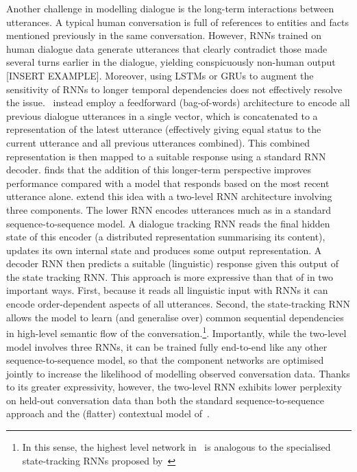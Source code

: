 \documentclass[11pt,letterpaper]{article}
\begin{document}
Another challenge in modelling dialogue is the long-term interactions between utterances. A typical human conversation is full of references to entities and facts mentioned previously in the same conversation. However, RNNs trained on human dialogue data generate utterances that clearly contradict those made several turns earlier in the dialogue, yielding conspicuously non-human output [INSERT EXAMPLE]. Moreover, using LSTMs or GRUs to augment the sensitivity of RNNs to longer temporal dependencies does not effectively resolve the issue.~ instead employ a feedforward (bag-of-words) architecture to encode all previous dialogue utterances in a single vector, which is concatenated to a representation of the latest utterance (effectively giving equal status to the current utterance and all previous utterances combined). This combined representation is then mapped to a suitable response using a standard RNN decoder.  finds that the addition of this longer-term perspective improves performance compared with a model that responds based on the most recent utterance alone.  extend this idea with a two-level RNN architecture involving three components. The lower RNN encodes utterances much as in a standard sequence-to-sequence model. A dialogue tracking RNN reads the final hidden state of this encoder (a distributed representation summarising its content), updates its own internal state and produces some output representation. A decoder RNN then predicts a suitable (linguistic) response given this output of the state tracking RNN. This approach is more expressive than that of \cite{sordoni2015neural} in two important ways. First, because it reads all linguistic input with RNNs it can encode order-dependent aspects of all utterances. Second, the state-tracking RNN allows the model to learn (and generalise over) common sequential dependencies in high-level semantic flow of the conversation.\footnote{In this sense, the highest level network in~\cite{serban2016building} is analogous to the specialised state-tracking RNNs proposed by~}. Importantly, while the two-level model involves three RNNs, it can be trained fully end-to-end like any other sequence-to-sequence model, so that the component networks are optimised jointly to increase the likelihood of modelling observed conversation data. Thanks to its greater expressivity, however, the two-level RNN exhibits lower perplexity on held-out conversation data than both the standard sequence-to-sequence approach and the (flatter) contextual model of~\cite{sordoni2015neural}.
\end{document}

